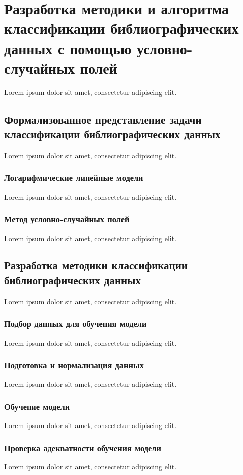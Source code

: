 \chapter{Разработка методики и алгоритма классификации библиографических данных с помощью условно-случайных полей}
Lorem ipsum dolor sit amet, consectetur adipiscing elit.

\section{Формализованное представление задачи классификации библиографических данных}
Lorem ipsum dolor sit amet, consectetur adipiscing elit.

\subsection{Логарифмические линейные модели}
Lorem ipsum dolor sit amet, consectetur adipiscing elit.

\subsection{Метод условно-случайных полей}
Lorem ipsum dolor sit amet, consectetur adipiscing elit.

\section{Разработка методики классификации библиографических данных}
Lorem ipsum dolor sit amet, consectetur adipiscing elit.

\subsection{Подбор данных для обучения модели}
Lorem ipsum dolor sit amet, consectetur adipiscing elit.

\subsection{Подготовка и нормализация данных}
Lorem ipsum dolor sit amet, consectetur adipiscing elit.

\subsection{Обучение модели}
Lorem ipsum dolor sit amet, consectetur adipiscing elit.

\subsection{Проверка адекватности обучения модели}
Lorem ipsum dolor sit amet, consectetur adipiscing elit.

